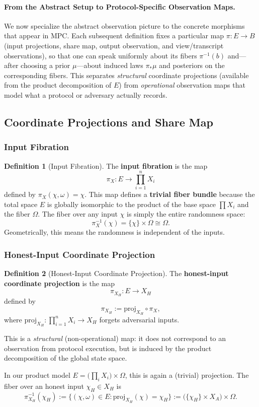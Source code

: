 \documentclass[11pt,a4paper]{article}
\theoremstyle{definition}
\newtheorem{definition}{Definition}[section]
\theoremstyle{plain}
\begin{document}
\paragraph{From the Abstract Setup to Protocol-Specific Observation Maps.}
We now specialize the abstract observation picture to the concrete morphisms that appear in MPC.
Each subsequent definition fixes a particular map $\pi:E\to B$ (input projections, share map, output observation, and view/transcript observations), so that one can speak uniformly about its fibers $\pi^{-1}(b)$ and---after choosing a prior $\mu$---about induced laws $\pi_*\mu$ and posteriors on the corresponding fibers.
This separates \emph{structural} coordinate projections (available from the product decomposition of $E$) from \emph{operational} observation maps that model what a protocol or adversary actually records.

\subsection{Coordinate Projections and Share Map}

\subsubsection{Input Fibration}
\begin{definition}[Input Fibration]
\label{def:input-fibration}
The \textbf{input fibration} is the map
\[
\pi_X: E \longrightarrow \prod_{i=1}^n X_i
\]
defined by $\pi_X(\chi, \omega) = \chi$. This map defines a \textbf{trivial fiber bundle} because the total space $E$ is globally isomorphic to the product of the base space $\prod X_i$ and the fiber $\Omega$. The fiber over any input $\chi$ is simply the entire randomness space:
\[
\pi_X^{-1}(\chi) = \{\chi\} \times \Omega \cong \Omega.
\]
Geometrically, this means the randomness is independent of the inputs.
\end{definition}

\subsubsection{Honest-Input Coordinate Projection}
\begin{definition}[Honest-Input Coordinate Projection]
\label{def:honest-input-fibration}
The \textbf{honest-input coordinate projection} is the map
\[
\pi_{X_H}: E \longrightarrow X_H
\]
defined by
\[
\pi_{X_H} := \mathrm{proj}_{X_H} \circ \pi_X,
\]
where $\mathrm{proj}_{X_H}: \prod_{i=1}^n X_i \to X_H$ forgets adversarial inputs.

This is a \emph{structural} (non-operational) map: it does not correspond to an observation from protocol execution, but is induced by the product decomposition of the global state space.

In our product model $E = \bigl(\prod_i X_i\bigr)\times \Omega$, this is again a (trivial) projection. The fiber over an honest input $\chi_H \in X_H$ is
\[
\pi_{X_H}^{-1}(\chi_H)
:= \{(\chi,\omega)\in E : \mathrm{proj}_{X_H}(\chi)=\chi_H\}
:= \bigl(\{\chi_H\}\times X_A\bigr)\times \Omega.
\]
\end{definition}
\end{document}

